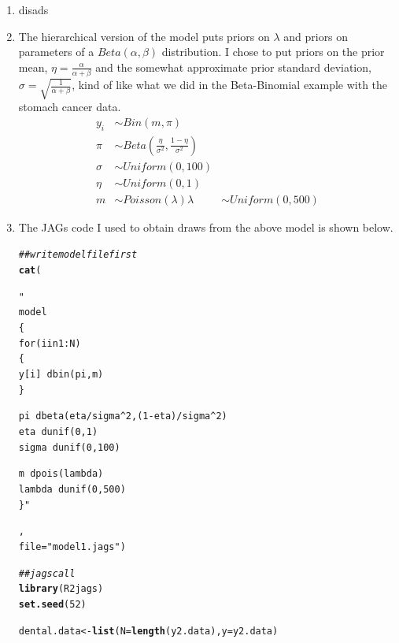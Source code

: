 \documentclass[12pt]{article}\usepackage[]{graphicx}\usepackage[]{color}
\makeatletter
\newcommand{\hlnum}[1]{\textcolor[rgb]{0.686,0.059,0.569}{#1}}%
\newcommand{\hlstr}[1]{\textcolor[rgb]{0.192,0.494,0.8}{#1}}%
\newcommand{\hlcom}[1]{\textcolor[rgb]{0.678,0.584,0.686}{\textit{#1}}}%
\newcommand{\hlstd}[1]{\textcolor[rgb]{0.345,0.345,0.345}{#1}}%
\newcommand{\hlkwb}[1]{\textcolor[rgb]{0.69,0.353,0.396}{#1}}%
\newcommand{\hlkwc}[1]{\textcolor[rgb]{0.333,0.667,0.333}{#1}}%
\newcommand{\hlkwd}[1]{\textcolor[rgb]{0.737,0.353,0.396}{\textbf{#1}}}%
\newenvironment{kframe}{%
 \def\at@end@of@kframe{}%
 \ifinner\ifhmode%
  \def\at@end@of@kframe{\end{minipage}}%
  \begin{minipage}{\columnwidth}%
 \fi\fi%
 \def\FrameCommand##1{\hskip\@totalleftmargin \hskip-\fboxsep
 \colorbox{shadecolor}{##1}\hskip-\fboxsep
     \hskip-\linewidth \hskip-\@totalleftmargin \hskip\columnwidth}%
 \MakeFramed {\advance\hsize-\width
   \@totalleftmargin\z@ \linewidth\hsize
   \@setminipage}}%
 {\par\unskip\endMakeFramed%
 \at@end@of@kframe}
\newenvironment{knitrout}{}{} %
\makeatother
\begin{document}
\begin{enumerate}
\begin{enumerate}
\begin{knitrout}
\end{knitrout}

\item disads

\item The hierarchical version of the model puts priors on $\lambda$ and priors on parameters of a $Beta(\alpha, \beta)$ distribution. I chose to put priors on the prior mean, $\eta = \frac{\alpha}{\alpha+\beta}$ and the somewhat approximate prior standard deviation, $\sigma = \sqrt{\frac{1}{\alpha + \beta}}$, kind of like what we did in the Beta-Binomial example with the stomach cancer data.
\begin{align*}
y_i &\sim Bin(m, \pi) \\
\pi &\sim Beta(\frac{\eta}{\sigma^2}, \frac{1-\eta}{\sigma^2}) \\
\sigma &\sim Uniform(0, 100) \\
\eta &\sim Uniform(0, 1) \\
m &\sim Poisson(\lambda)
\lambda &\sim Uniform(0, 500)
\end{align*}

\item The JAGs code I used to obtain draws from the above model is shown below.

\begin{knitrout}\footnotesize
{}\color{fgcolor}\begin{kframe}
\begin{alltt}
\hlcom{##write model file first}
\hlkwd{cat}\hlstd{(}\hlstr{"
model
\{
for(i in 1:N)
\{
y[i] ~ dbin(pi, m)
\}

pi ~ dbeta(eta/sigma^2, (1-eta)/sigma^2)
eta ~ dunif(0, 1)
sigma ~ dunif(0, 100)

m ~ dpois(lambda)
lambda ~ dunif(0, 500)
\}"}\hlstd{,}
\hlkwc{file}\hlstd{=}\hlstr{"model1.jags"}\hlstd{)}
\end{alltt}
\end{kframe}
\end{knitrout}


\begin{knitrout}\footnotesize
{}\color{fgcolor}\begin{kframe}
\begin{alltt}
\hlcom{##jags call}
\hlkwd{library}\hlstd{(R2jags)}
\hlkwd{set.seed}\hlstd{(}\hlnum{52}\hlstd{)}


\hlstd{dental.data} \hlkwb{<-} \hlkwd{list}\hlstd{(}\hlkwc{N}\hlstd{=}\hlkwd{length}\hlstd{(y2.data),} \hlkwc{y}\hlstd{=y2.data)}


\end{alltt}
\end{kframe}
\end{knitrout}
\end{enumerate}
\end{enumerate}
\end{document}
